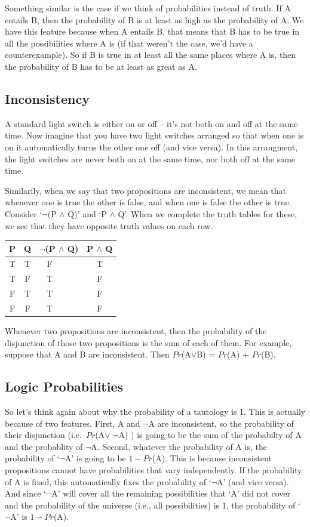 \documentclass[]{tufte-book}
\begin{document}
Something similar is the case if we think of probabilities instead of truth. If A entails B, then the probability of B is at least as high as the probability of A. We have this feature because when A entails B, that means that B has to be true in all the possibilities where A is (if that weren't the case, we'd have a counterexample). So if B is true in at least all the same places where A is, then the probability of B has to be at least as great as A.

\hypertarget{inconsistency}{%
\subsection{Inconsistency}\label{inconsistency}}

A standard light switch is either on or off -- it's not both on and off at the same time. Now imagine that you have two light switches arranged so that when one is on it automatically turns the other one off (and vice versa). In this arrangment, the light switches are never both on at the same time, nor both off at the same time.

Similarily, when we say that two propositions are inconsistent, we mean that whenever one is true the other is false, and when one is false the other is true. Consider `\(\neg\)(P \(\wedge\) Q)' and `P \(\wedge\) Q'. When we complete the truth tables for these, we see that they have opposite truth values on each row.

\begin{longtable}[]{@{}cccc@{}}
\toprule
P & Q & \(\neg\)(P \(\wedge\) Q) & P \(\wedge\) Q\tabularnewline
\midrule
\endhead
T & T & F\(~~~~~~~~~~\) & T\tabularnewline
T & F & T\(~~~~~~~~~~\) & F\tabularnewline
F & T & T\(~~~~~~~~~~\) & F\tabularnewline
F & F & T\(~~~~~~~~~~\) & F\tabularnewline
\bottomrule
\end{longtable}

Whenever two propositions are inconsistent, then the probability of the disjunction of those two propositions is the sum of each of them. For example, suppose that A and B are inconsistent. Then \(Pr\)(A\(\vee\)B) = \(Pr\)(A) + \(Pr\)(B).

\hypertarget{logic-probabilities}{%
\subsection{Logic Probabilities}\label{logic-probabilities}}

So let's think again about why the probability of a tautology is 1. This is actually because of two features. First, A and \(\neg\)A are inconsistent, so the probability of their disjunction (i.e.~\(Pr\)(A\(\vee\) \(\neg\)A) ) is going to be the sum of the probabilty of A and the probablity of \(\neg\)A. Second, whatever the probability of A is, the probability of `\(\neg\)A' is going to be \(1-Pr\)(A). This is because inconsistent propositions cannot have probabilities that vary independently. If the probability of A is fixed, this automatically fixes the probability of `\(\neg\)A' (and vice versa). And since `\(\neg\)A' will cover all the remaining possibilities that `A' did not cover and the probability of the universe (i.e., all possibilities) is 1, the probability of `\(\neg\)A' is \(1-Pr\)(A).
\end{document}
